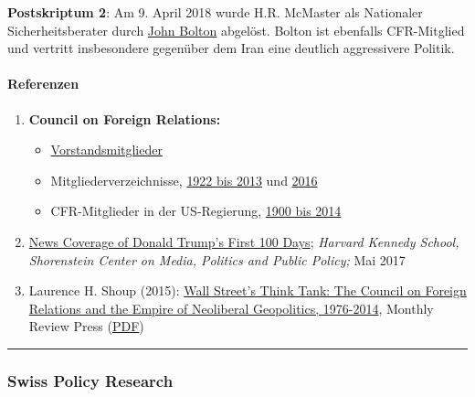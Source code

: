 \textbf{Postskriptum 2}: Am 9. April 2018 wurde H.R. McMaster als
Nationaler Sicherheitsberater durch
\href{https://de.wikipedia.org/wiki/John_R._Bolton}{John Bolton}
abgelöst. Bolton ist ebenfalls CFR-Mitglied und vertritt insbesondere
gegenüber dem Iran eine deutlich aggressivere Politik.

\hypertarget{referenzen}{%
\paragraph{Referenzen}\label{referenzen}}

\begin{enumerate}
\def\labelenumi{\arabic{enumi}.}
\tightlist
\item
  \textbf{Council on Foreign Relations:}

  \begin{itemize}
  \tightlist
  \item
    \href{https://www.cfr.org/board-directors}{Vorstandsmitglieder}
  \item
    Mitgliederverzeichnisse,
    \href{https://swprs.files.wordpress.com/2017/07/council-on-foreign-relations-membership-rosters-1922-2013.pdf}{1922
    bis 2013} und
    \href{https://swprs.files.wordpress.com/2017/07/cfr-members-2016.pdf}{2016}
  \item
    CFR-Mitglieder in der US-Regierung,
    \href{https://swprs.files.wordpress.com/2017/07/cfr-administration-members-1900-2014.pdf}{1900
    bis 2014}
  \end{itemize}
\item
  \href{https://shorensteincenter.org/news-coverage-donald-trumps-first-100-days/}{News
  Coverage of Donald Trump's First 100 Days}; \emph{Harvard Kennedy
  School, Shorenstein Center on Media, Politics and Public Policy;} Mai
  2017
\item
  Laurence H. Shoup (2015):
  \href{https://monthlyreview.org/product/wall-streets-think-tank/}{Wall
  Street's Think Tank: The Council on Foreign Relations and the Empire
  of Neoliberal Geopolitics, 1976-2014}, Monthly Review Press
  (\href{https://swprs.files.wordpress.com/2019/08/cfr-wallstreet-think-tank-shoup-2015.pdf}{PDF})
\end{enumerate}

\begin{center}\rule{0.5\linewidth}{\linethickness}\end{center}

\hypertarget{swiss-policy-research}{%
\subsubsection{Swiss Policy Research}\label{swiss-policy-research}}

